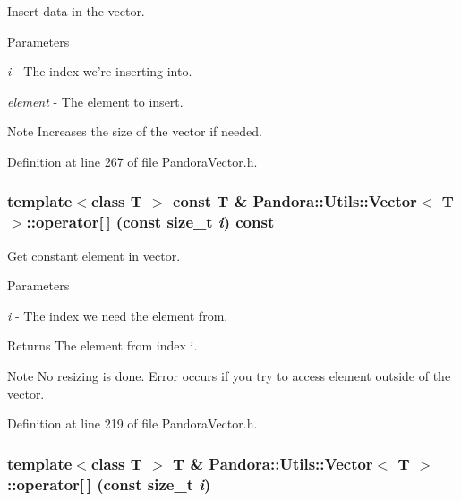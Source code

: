 Insert data in the vector. 
\begin{DoxyParams}{Parameters}
\item[{\em i}]-\/ The index we're inserting into. \item[{\em element}]-\/ The element to insert. \end{DoxyParams}
\begin{DoxyNote}{Note}
Increases the size of the vector if needed. 
\end{DoxyNote}


Definition at line 267 of file PandoraVector.h.\hypertarget{classPandora_1_1Utils_1_1Vector_a9841fe5df9567810a8be69891e5bf5cf}{
\subsubsection[{operator[]}]{\setlength{\rightskip}{0pt plus 5cm}template$<$class T $>$ const T \& {\bf Pandora::Utils::Vector}$<$ T $>$::operator\mbox{[}$\,$\mbox{]} (const size\_\-t {\em i}) const}}
\label{classPandora_1_1Utils_1_1Vector_a9841fe5df9567810a8be69891e5bf5cf}


Get constant element in vector. 
\begin{DoxyParams}{Parameters}
\item[{\em i}]-\/ The index we need the element from. \end{DoxyParams}
\begin{DoxyReturn}{Returns}
The element from index i. 
\end{DoxyReturn}
\begin{DoxyNote}{Note}
No resizing is done. Error occurs if you try to access element outside of the vector. 
\end{DoxyNote}


Definition at line 219 of file PandoraVector.h.\hypertarget{classPandora_1_1Utils_1_1Vector_adef2d8c160a9f9c2398f3c92f7874f4e}{
\subsubsection[{operator[]}]{\setlength{\rightskip}{0pt plus 5cm}template$<$class T $>$ T \& {\bf Pandora::Utils::Vector}$<$ T $>$::operator\mbox{[}$\,$\mbox{]} (const size\_\-t {\em i})}}
\label{classPandora_1_1Utils_1_1Vector_adef2d8c160a9f9c2398f3c92f7874f4e}


